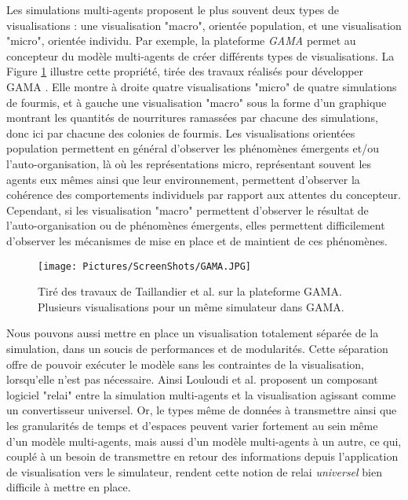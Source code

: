 		Les simulations multi-agents proposent le plus souvent deux types de visualisations : une visualisation "macro", orientée population, et une visualisation "micro", orientée individu. Par exemple, la plateforme \textit{GAMA} \cite{taillandier_building_2019} permet au concepteur du modèle multi-agents de créer différents types de visualisations. La Figure \ref{GAMA} illustre cette propriété, tirée des travaux réalisés pour développer GAMA \cite{taillandier_building_2019}. Elle montre à droite quatre visualisations "micro" de quatre simulations de fourmis, et à gauche une visualisation "macro" sous la forme d'un graphique montrant les quantités de nourritures ramassées par chacune des simulations, donc ici par chacune des colonies de fourmis.
		Les visualisations orientées population permettent en général d'observer les phénomènes émergents et/ou l'auto-organisation, là où les représentations micro, représentant souvent les agents eux mêmes ainsi que leur environnement, permettent d'observer la cohérence des comportements individuels par rapport aux attentes du concepteur. Cependant, si les visualisation "macro" permettent d'observer le résultat de l'auto-organisation ou de phénomènes émergents, elles permettent difficilement d'observer les mécanismes de mise en place et de maintient de ces phénomènes.
		
		\begin{figure}
			\centering
			\texttt{[image: Pictures/ScreenShots/GAMA.JPG]}
			\caption{Tiré des travaux de Taillandier et al. \cite{taillandier_building_2019} sur la plateforme GAMA. Plusieurs visualisations pour un même simulateur dans GAMA.}
			\label{GAMA}
		\end{figure}
		
		Nous pouvons aussi mettre en place un visualisation totalement séparée de la simulation, dans un soucis de performances et de modularités. Cette séparation offre de pouvoir exécuter le modèle sans les contraintes de la visualisation, lorsqu'elle n'est pas nécessaire. Ainsi Louloudi et al. \cite{louloudi_new_2012} proposent un composant logiciel "relai" entre la simulation multi-agents et la visualisation agissant comme un convertisseur universel.
		Or, le types même de données à transmettre ainsi que les granularités de temps et d'espaces peuvent varier fortement au sein même d'un modèle multi-agents, mais aussi d'un modèle multi-agents à un autre, ce qui, couplé à un besoin de transmettre en retour des informations depuis l'application de visualisation vers le simulateur, rendent cette notion de relai \textit{universel} bien difficile à mettre en place.
		
